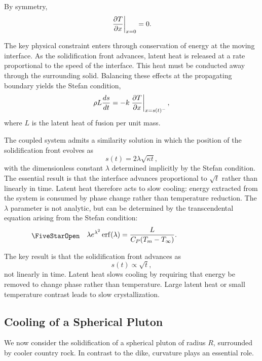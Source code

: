 By symmetry,
\begin{equation}
    \eval{\pdv{T}{x}}_{x=0} = 0.
\end{equation}

The key physical constraint enters through conservation of energy at the moving
interface. As the solidification front advances, latent heat is released at a rate
proportional to the speed of the interface. This heat must be conducted away through the surrounding solid. Balancing these effects at the propagating boundary yields the Stefan condition,
\begin{equation}
    \rho L \frac{ds}{dt} = - k \eval{\pdv{T}{x}}_{x = s(t)^-},
\end{equation}
where $L$ is the latent heat of fusion per unit mass.

The coupled system admits a similarity solution in which the position of the
solidification front evolves as
\begin{equation}
    s(t) = 2 \lambda \sqrt{\kappa t},
\end{equation}
with the dimensionless constant $\lambda$ determined implicitly by the Stefan
condition. The essential result is that the interface advances proportional to
$\sqrt{t}$ rather than linearly in time. Latent heat therefore acts to slow cooling: energy extracted from the system is consumed by phase change rather than temperature reduction. The $\lambda$ parameter is not analytic, but can be determined by the transcendental equation arising from the Stefan condition:
\begin{equation}
    \workeq
    \lambda e^{\lambda^2} \erf (\lambda) = \frac{L}{C_P (T_m - T_\infty)}.
\end{equation}

The key result is that the solidification front advances as
\[
    s(t) \propto \sqrt{t},
\]
not linearly in time. Latent heat slows cooling by requiring that energy be removed
to change phase rather than temperature. Large latent heat or small temperature
contrast leads to slow crystallization.

\subsection{Cooling of a Spherical Pluton}

We now consider the solidification of a spherical pluton of radius $R$, surrounded
by cooler country rock. In contrast to the dike, curvature plays an essential role.

